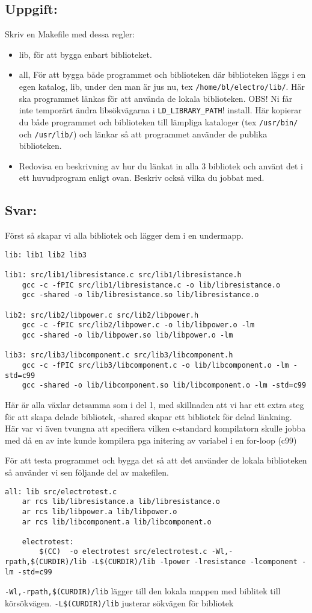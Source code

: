 \documentclass[10pt, a4paper]{article}
\begin{document}
\subsection*{Uppgift:}
Skriv en Makefile med dessa regler:
\begin{itemize}
\item lib, för att bygga enbart biblioteket.
\item all, För att bygga både programmet och biblioteken där biblioteken läggs i en egen katalog, lib,  under den man är jus nu, tex \verb#/home/bl/electro/lib/#. Här ska programmet länkas för att använda de lokala biblioteken. OBS! Ni får inte temporärt ändra libsökvägarna i \verb#LD_LIBRARY_PATH#!
install. Här kopierar du både programmet och biblioteken till lämpliga kataloger (tex \verb#/usr/bin/# och \verb#/usr/lib/#) och länkar så att programmet använder de publika biblioteken.
\item Redovisa en beskrivning av hur du länkat in alla 3 bibliotek och använt det i ett huvudprogram enligt ovan. Beskriv också vilka du jobbat med.
\end{itemize}
\subsection*{Svar:}

 Först så skapar vi alla bibliotek och lägger dem i en undermapp.
\begin{verbatim}
lib: lib1 lib2 lib3

lib1: src/lib1/libresistance.c src/lib1/libresistance.h
    gcc -c -fPIC src/lib1/libresistance.c -o lib/libresistance.o
    gcc -shared -o lib/libresistance.so lib/libresistance.o

lib2: src/lib2/libpower.c src/lib2/libpower.h 
    gcc -c -fPIC src/lib2/libpower.c -o lib/libpower.o -lm
    gcc -shared -o lib/libpower.so lib/libpower.o -lm

lib3: src/lib3/libcomponent.c src/lib3/libcomponent.h 
    gcc -c -fPIC src/lib3/libcomponent.c -o lib/libcomponent.o -lm -std=c99
    gcc -shared -o lib/libcomponent.so lib/libcomponent.o -lm -std=c99
\end{verbatim}
Här är alla växlar detsamma som i del 1, med skillnaden att vi har ett extra steg för att skapa delade bibliotek, -shared skapar ett bibliotek för delad länkning. Här var vi även tvungna att specifiera vilken c-standard kompilatorn skulle jobba med då en av inte kunde kompilera pga initering av variabel i en for-loop (c99)

För att testa programmet och bygga det så att det använder de lokala biblioteken så använder vi sen följande del av makefilen.
\begin{verbatim}
all: lib src/electrotest.c
    ar rcs lib/libresistance.a lib/libresistance.o
    ar rcs lib/libpower.a lib/libpower.o
    ar rcs lib/libcomponent.a lib/libcomponent.o
   
    electrotest: 
		$(CC)  -o electrotest src/electrotest.c -Wl,-rpath,$(CURDIR)/lib -L$(CURDIR)/lib -lpower -lresistance -lcomponent -lm -std=c99
\end{verbatim}
\verb!-Wl,-rpath,$(CURDIR)/lib! lägger till den lokala mappen med biblitek till körsökvägen.
\verb!-L$(CURDIR)/lib! justerar sökvägen för bibliotek
\end{document}
